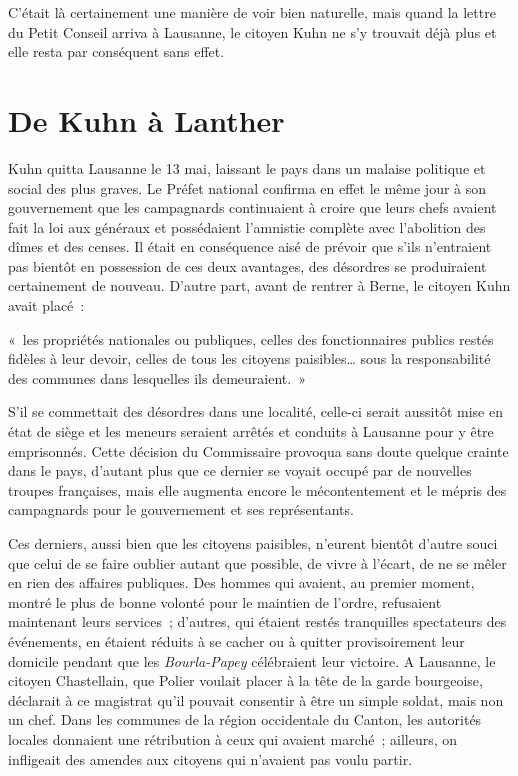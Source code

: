 \documentclass[french,twoside]{book} %
\newenvironment{quoteblock}%
  {\begin{quoting}}
  {\end{quoting}}
\newenvironment{quotebar}{%
    \def\FrameCommand{{\color{rubric!10!}\vrule width 0.5em} \hspace{0.9em}}%
    \def\OuterFrameSep{\itemsep} %
    \MakeFramed {\advance\hsize-\width \FrameRestore}
  }%
  {%
    \endMakeFramed
  }
\renewenvironment{quoteblock}%
  {%
    \savenotes
    \setstretch{0.9}
    \normalfont
    \begin{quotebar}
  }
  {%
    \end{quotebar}
    \spewnotes
  }
\begin{document}
\noindent C’était là certainement une manière de voir bien naturelle, mais quand la lettre du Petit Conseil arriva à Lausanne, le citoyen Kuhn ne s’y trouvait déjà plus et elle resta par conséquent sans effet.
\section[{De Kuhn à Lanther}]{De Kuhn à Lanther}
\noindent Kuhn quitta Lausanne le 13 mai, laissant le pays dans un malaise politique et social des plus graves. Le Préfet national confirma en effet le même jour à son gouvernement que les campagnards continuaient à croire que leurs chefs avaient fait la loi aux généraux et possédaient l’amnistie complète avec l’abolition des dîmes et des censes. Il était en conséquence aisé de prévoir que s’ils n’entraient pas bientôt en possession de ces deux avantages, des désordres se produiraient certainement de nouveau. D’autre part, avant de rentrer à Berne, le citoyen Kuhn avait placé :\par

\begin{quoteblock}
\noindent « les propriétés nationales ou publiques, celles des fonctionnaires publics restés fidèles à leur devoir, celles de tous les citoyens paisibles… sous la responsabilité des communes dans lesquelles ils demeuraient. »\end{quoteblock}

\noindent S’il se commettait des désordres dans une localité, celle-ci serait aussitôt mise en état de siège et les meneurs seraient arrêtés et conduits à Lausanne pour y être emprisonnés. Cette décision du Commissaire provoqua sans doute quelque crainte dans le pays, d’autant plus que ce dernier se voyait occupé par de nouvelles troupes françaises, mais elle augmenta encore le mécontentement et le mépris des campagnards pour le gouvernement et ses représentants.\par
Ces derniers, aussi bien que les citoyens paisibles, n’eurent bientôt d’autre souci que celui de se faire oublier autant que possible, de vivre à l’écart, de ne se mêler en rien des affaires publiques. Des hommes qui avaient, au premier moment, montré le plus de bonne volonté pour le maintien de l’ordre, refusaient maintenant leurs services ; d’autres, qui étaient restés tranquilles spectateurs des événements, en étaient réduits à se cacher ou à quitter provisoirement leur domicile pendant que les \emph{Bourla-Papey} célébraient leur victoire. A Lausanne, le citoyen Chastellain, que Polier voulait placer à la tête de la garde bourgeoise, déclarait à ce magistrat qu’il pouvait consentir à être un simple soldat, mais non un chef. Dans les communes de la région occidentale du Canton, les autorités locales donnaient une rétribution à ceux qui avaient marché ; ailleurs, on infligeait des amendes aux citoyens qui n’avaient pas voulu partir.\par
\end{document}
